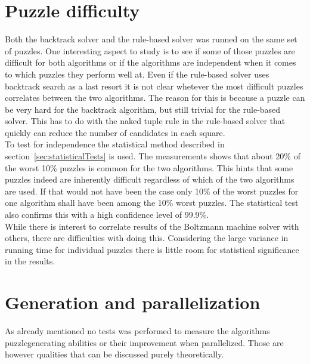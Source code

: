 \documentclass[a4paper,11pt]{kth-mag}
\begin{document}
\FloatBarrier
\section{Puzzle difficulty}
\label{sec:difficultyAnalysis}
Both the backtrack solver and the rule-based solver was runned on the same set of puzzles.
One interesting aspect to study is to see if some of those puzzles are difficult for both algorithms or if the algorithms are independent when it comes to which puzzles they perform well at.
Even if the rule-based solver uses backtrack search as a last resort it is not clear whetever the most difficult puzzles correlates between the two algorithms.
The reason for this is because a puzzle can be very hard for the backtrack algorithm, but still trivial for the rule-based solver. 
This has to do with the naked tuple rule in the rule-based solver that quickly can reduce the number of candidates in each square.
\\
To test for independence the statistical method described in section~\ref{sec:statisticalTests} is used.
The measurements shows that about 20\% of the worst 10\% puzzles is common for the two algorithms. 
This hints that some puzzles indeed are inherently difficult regardless of which of the two algorithms are used.
If that would not have been the case only 10\% of the worst puzzles for one algorithm shall have been among the 10\% worst puzzles.
The statistical test also confirms this with a high confidence level of 99.9\%.
\\
While there is interest to correlate results of the Boltzmann machine solver with others, there are difficulties with doing this.
Considering the large variance in running time for individual puzzles there is little room for statistical significance in the results.

\section{Generation and parallelization}
\label{sec:generation}
As already mentioned no tests was performed to measure the algorithms puzzlegenerating abilities or their improvement when parallelized.
Those are however qualities that can be discussed purely theoretically.
\end{document}
